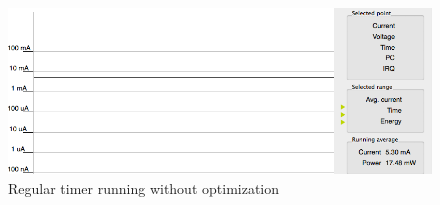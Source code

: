 \begin{figure}[H]
  \centering
  \includegraphics[clip, trim=0cm 0cm 0cm 0cm, width=12cm]{fig/playingWithoutOptimizations.png}
  \caption{Regular timer running without optimization}
\end{figure}
